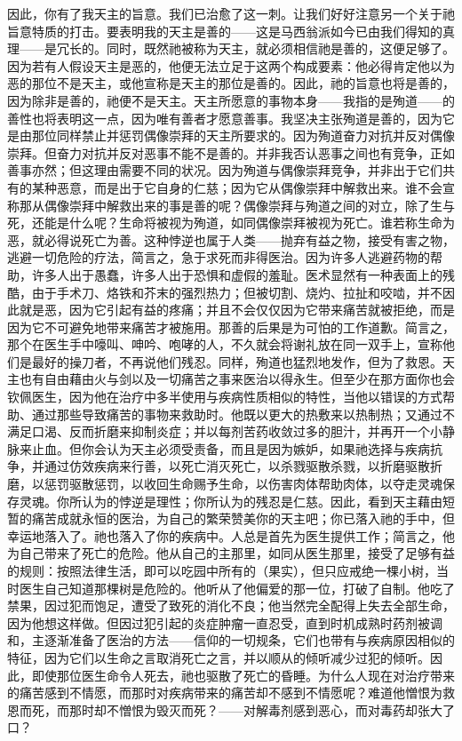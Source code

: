 因此，你有了我天主的旨意。我们已治愈了这一刺。让我们好好注意另一个关于祂旨意特质的打击。要表明我的天主是善的——这是马西翁派如今已由我们得知的真理——是冗长的。同时，既然祂被称为天主，就必须相信祂是善的，这便足够了。因为若有人假设天主是恶的，他便无法立足于这两个构成要素：他必得肯定他以为恶的那位不是天主，或他宣称是天主的那位是善的。因此，祂的旨意也将是善的，因为除非是善的，祂便不是天主。天主所愿意的事物本身——我指的是殉道——的善性也将表明这一点，因为唯有善者才愿意善事。我坚决主张殉道是善的，因为它是由那位同样禁止并惩罚偶像崇拜的天主所要求的。因为殉道奋力对抗并反对偶像崇拜。但奋力对抗并反对恶事不能不是善的。并非我否认恶事之间也有竞争，正如善事亦然；但这理由需要不同的状况。因为殉道与偶像崇拜竞争，并非出于它们共有的某种恶意，而是出于它自身的仁慈；因为它从偶像崇拜中解救出来。谁不会宣称那从偶像崇拜中解救出来的事是善的呢？偶像崇拜与殉道之间的对立，除了生与死，还能是什么呢？生命将被视为殉道，如同偶像崇拜被视为死亡。谁若称生命为恶，就必得说死亡为善。这种悖逆也属于人类——抛弃有益之物，接受有害之物，逃避一切危险的疗法，简言之，急于求死而非得医治。因为许多人逃避药物的帮助，许多人出于愚蠢，许多人出于恐惧和虚假的羞耻。医术显然有一种表面上的残酷，由于手术刀、烙铁和芥末的强烈热力；但被切割、烧灼、拉扯和咬啮，并不因此就是恶，因为它引起有益的疼痛；并且不会仅仅因为它带来痛苦就被拒绝，而是因为它不可避免地带来痛苦才被施用。那善的后果是为可怕的工作道歉。简言之，那个在医生手中嚎叫、呻吟、咆哮的人，不久就会将谢礼放在同一双手上，宣称他们是最好的操刀者，不再说他们残忍。同样，殉道也猛烈地发作，但为了救恩。天主也有自由藉由火与剑以及一切痛苦之事来医治以得永生。但至少在那方面你也会钦佩医生，因为他在治疗中多半使用与疾病性质相似的特性，当他以错误的方式帮助、通过那些导致痛苦的事物来救助时。他既以更大的热敷来以热制热；又通过不满足口渴、反而折磨来抑制炎症；并以每剂苦药收敛过多的胆汁，并再开一个小静脉来止血。但你会认为天主必须受责备，而且是因为嫉妒，如果祂选择与疾病抗争，并通过仿效疾病来行善，以死亡消灭死亡，以杀戮驱散杀戮，以折磨驱散折磨，以惩罚驱散惩罚，以收回生命赐予生命，以伤害肉体帮助肉体，以夺走灵魂保存灵魂。你所认为的悖逆是理性；你所认为的残忍是仁慈。因此，看到天主藉由短暂的痛苦成就永恒的医治，为自己的繁荣赞美你的天主吧；你已落入祂的手中，但幸运地落入了。祂也落入了你的疾病中。人总是首先为医生提供工作；简言之，他为自己带来了死亡的危险。他从自己的主那里，如同从医生那里，接受了足够有益的规则：按照法律生活，即可以吃园中所有的（果实），但只应戒绝一棵小树，当时医生自己知道那棵树是危险的。他听从了他偏爱的那一位，打破了自制。他吃了禁果，因过犯而饱足，遭受了致死的消化不良；他当然完全配得上失去全部生命，因为他想这样做。但因过犯引起的炎症肿瘤一直忍受，直到时机成熟时药剂被调和，主逐渐准备了医治的方法——信仰的一切规条，它们也带有与疾病原因相似的特征，因为它们以生命之言取消死亡之言，并以顺从的倾听减少过犯的倾听。因此，即使那位医生命令人死去，祂也驱散了死亡的昏睡。为什么人现在对治疗带来的痛苦感到不情愿，而那时对疾病带来的痛苦却不感到不情愿呢？难道他憎恨为救恩而死，而那时却不憎恨为毁灭而死？——对解毒剂感到恶心，而对毒药却张大了口？\par


